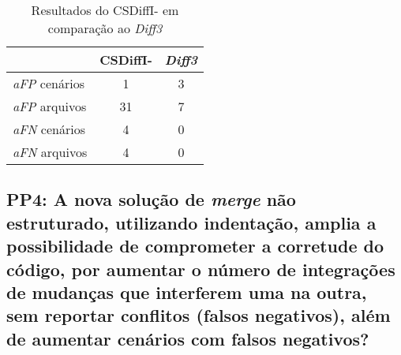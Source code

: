 \begin{table}[ht]
	\begin{center}
		\begin{tabular}{|l|c|c|}
			\hline
			\textbf{ }          & \textbf{CSDiffI-} & \textbf{\emph{Diff3}} \\
			\hline
			\emph{aFP} cenários & 1                 & 3                     \\
			\emph{aFP} arquivos & 31                & 7                     \\
			\emph{aFN} cenários & 4                 & 0                     \\
			\emph{aFN} arquivos & 4                 & 0                     \\
			\hline
		\end{tabular}
	\end{center}
	\caption{Resultados do CSDiffI- em comparação ao \emph{Diff3}}\label{csdiff_indentation_minus_afp_afn}
\end{table}


\subsection{PP4: A nova solução de \emph{merge} não estruturado, utilizando
	indentação, amplia a possibilidade de comprometer a corretude do código,
	por aumentar o número de integrações de mudanças que interferem uma na
	outra, sem reportar conflitos (falsos negativos), além de aumentar cenários
	com falsos negativos?}

